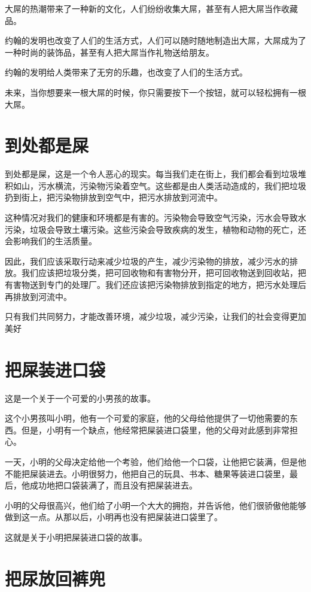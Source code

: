 \documentclass[titlepage,oneside]{ctexbook}
\begin{document}
大屌的热潮带来了一种新的文化，人们纷纷收集大屌，甚至有人把大屌当作收藏品。

约翰的发明也改变了人们的生活方式，人们可以随时随地制造出大屌，大屌成为了一种时尚的装饰品，甚至有人把大屌当作礼物送给朋友。

约翰的发明给人类带来了无穷的乐趣，也改变了人们的生活方式。

未来，当你想要来一根大屌的时候，你只需要按下一个按钮，就可以轻松拥有一根大屌。


\chapter{到处都是屎}
到处都是屎，这是一个令人恶心的现实。每当我们走在街上，我们都会看到垃圾堆积如山，污水横流，污染物污染着空气。这些都是由人类活动造成的，我们把垃圾扔到街上，把污染物排放到空气中，把污水排放到河流中。

这种情况对我们的健康和环境都是有害的。污染物会导致空气污染，污水会导致水污染，垃圾会导致土壤污染。这些污染会导致疾病的发生，植物和动物的死亡，还会影响我们的生活质量。

因此，我们应该采取行动来减少垃圾的产生，减少污染物的排放，减少污水的排放。我们应该把垃圾分类，把可回收物和有害物分开，把可回收物送到回收站，把有害物送到专门的处理厂。我们还应该把污染物排放到指定的地方，把污水处理后再排放到河流中。

只有我们共同努力，才能改善环境，减少垃圾，减少污染，让我们的社会变得更加美好

\chapter{把屎装进口袋}
这是一个关于一个可爱的小男孩的故事。

这个小男孩叫小明，他有一个可爱的家庭，他的父母给他提供了一切他需要的东西。但是，小明有一个缺点，他经常把屎装进口袋里，他的父母对此感到非常担心。

一天，小明的父母决定给他一个考验，他们给他一个口袋，让他把它装满，但是他不能把屎装进去。小明很努力，他把自己的玩具、书本、糖果等装进口袋里，最后，他成功地把口袋装满了，而且没有把屎装进去。

小明的父母很高兴，他们给了小明一个大大的拥抱，并告诉他，他们很骄傲他能够做到这一点。从那以后，小明再也没有把屎装进口袋里了。

这就是关于小明把屎装进口袋的故事。

\chapter{把尿放回裤兜}
\end{document}
